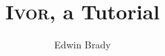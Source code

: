 \documentclass{article}
\newcommand{\Ivor}{\textsc{Ivor}}
\begin{document}
\title{\Ivor{}, a Tutorial}
\author{Edwin Brady}


\maketitle











\begin{small}



%

\end{small}
\end{document}
